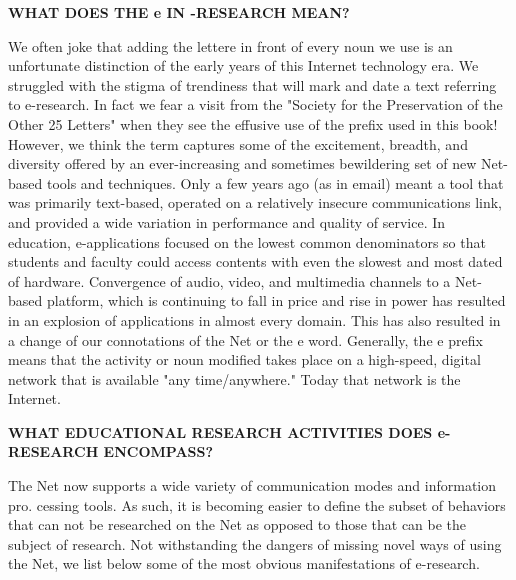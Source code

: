 \documentclass[a4, 11pt]{article}
\begin{document}
	\vspace{0.5cm}
{\large \textbf{WHAT DOES THE e IN -RESEARCH MEAN?}}
		\vspace{0.5cm}
		
	We often joke that adding the lettere in front of every noun we use is an unfortunate distinction of the early years of this Internet technology era. We struggled with the stigma of trendiness that will mark and date a text referring to e-research. In fact we fear a visit from the "Society for the Preservation of the Other 25 Letters" when they see the effusive use of the prefix used in this book! However, we think the term captures some of the excitement, breadth, and diversity offered by an ever-increasing and sometimes bewildering set of new Net-based tools and techniques. Only a few years ago (as in email) meant a tool that was primarily text-based, operated on a relatively insecure communications link, and provided a wide variation in performance and quality of service. In education, e-applications focused on the lowest common denominators so that students and faculty could access contents with even the slowest and most dated of hardware. Convergence of audio, video, and multimedia channels to a Net-based platform, which is continuing to fall in price and rise in power has resulted in an explosion of applications in almost every domain. This has also resulted in a change of our connotations of the Net or the e word. Generally, the e prefix means that the activity or noun modified takes place on a high-speed, digital network that is available "any time/anywhere." Today that network is the Internet.
	
		\vspace{0.5cm}
{\large \textbf{WHAT EDUCATIONAL RESEARCH ACTIVITIES DOES e-RESEARCH ENCOMPASS?}}
	\vspace{0.5cm}
	
The Net now supports a wide variety of communication modes and information pro. cessing tools. As such, it is becoming easier to define the subset of behaviors that can not be researched on the Net as opposed to those that can be the subject of research. Not withstanding the dangers of missing novel ways of using the Net, we list below some of the most obvious manifestations of e-research.
\end{document}
